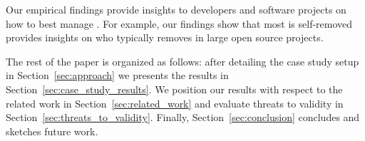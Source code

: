 Our empirical findings provide insights to developers and software projects on how to best manage \SATD. For example, our findings show that most \SATD is self-removed provides insights on who typically removes \SATD in large open source projects.

The rest of the paper is organized as follows: after detailing the case study setup in Section~\ref{sec:approach} we presents the results in Section~\ref{sec:case_study_results}. We position our results with respect to the related work in Section~\ref{sec:related_work} and evaluate threats to validity in Section~\ref{sec:threats_to_validity}. Finally, Section~\ref{sec:conclusion} concludes and sketches future work.





